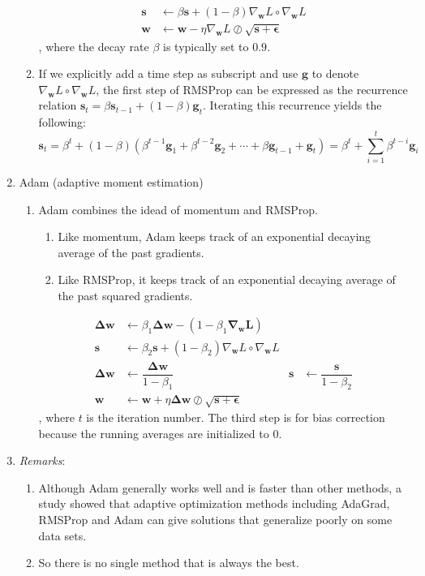 \documentclass[11pt]{article}
\begin{document}
\begin{enumerate}
\begin{enumerate}
        \begin{align*}
            \mathbf{s} &\gets \beta \mathbf{s} + (1-\beta) \nabla_{\mathbf{w}} L \circ \nabla_{\mathbf{w}} L\\
            \mathbf{w} &\gets \mathbf{w} - \eta \nabla_{\mathbf{w}} L \oslash \sqrt{\mathbf{s + \epsilon}}
        \end{align*}, where the decay rate $\beta$ is typically set to $0.9$.
        \item If we explicitly add a time step as subscript and use $\mathbf{g}$ to denote $\nabla_{\mathbf{w}} L \circ \nabla_{\mathbf{w}} L$, the first step of RMSProp can be expressed as the recurrence relation $\mathbf{s}_{t} = \beta \mathbf{s}_{t-1} + (1 - \beta) \mathbf{g}_{t}$. Iterating this recurrence yields the following: $$\mathbf{s}_{t} = \beta^t + (1-\beta)(\beta^{t -1} \mathbf{g}_1 + \beta^{t -2} \mathbf{g}_2 + \cdots + \beta \mathbf{g}_{t-1} + \mathbf{g}_t) = \beta^t + \sum_{i=1}^{t} \beta^{t-i} \mathbf{g}_{i}$$
    \end{enumerate}
    \item Adam (adaptive moment estimation)
    \begin{enumerate}
        \item Adam combines the idead of momentum and RMSProp.
        \begin{enumerate}
            \item Like momentum, Adam keeps track of an exponential decaying average of the past gradients.
            \item Like RMSProp, it keeps track of an exponential decaying average of the past squared gradients.
        \end{enumerate}
        \begin{align*}
            \mathbf{\Delta w} &\gets \beta_1 \mathbf{\Delta w} - (1-\beta_1 \mathbf{\nabla_{w} L})\\
            \mathbf{s} &\gets \beta_2 \mathbf{s} + (1-\beta_2) \nabla_{\mathbf{w}} L \circ \nabla_{\mathbf{w}} L\\
            \mathbf{\Delta w} &\gets \dfrac{\mathbf{\Delta w}}{1 - \beta_1} & \mathbf{s} &\gets \dfrac{\mathbf{s}}{1 - \beta_2}\\
            \mathbf{w} &\gets \mathbf{w} + \eta \mathbf{\Delta w} \oslash \sqrt{\mathbf{s + \epsilon}}
        \end{align*}, where $t$ is the iteration number. The third step is for bias correction because the running averages are initialized to $0$.
        
    \end{enumerate}
    \item[] \emph{Remarks}: \begin{enumerate}
        \item Although Adam generally works well and is faster than other methods, a study showed that adaptive optimization methods including AdaGrad, RMSProp and Adam can give solutions that generalize poorly on some data sets.
        \item So there is no single method that is always the best.
    \end{enumerate}
\end{enumerate}
\end{document}
